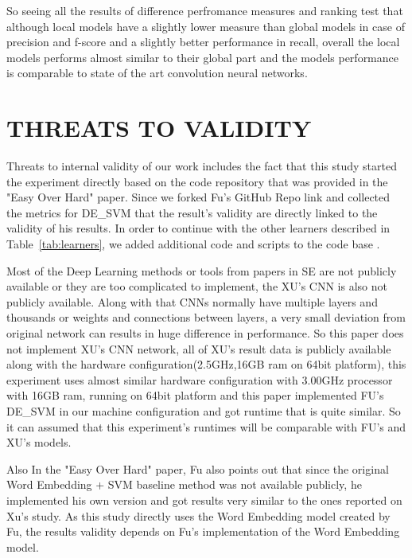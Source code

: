 \documentclass[sigconf]{acmart}
\theoremstyle{break}
\begin{document}
    So seeing all the results of difference perfromance measures and ranking test that although local models have a slightly lower measure than global models in case of precision and f-score and a slightly better performance in recall, overall the local models performs almost similar to their global part and the models performance is comparable to state of the art convolution neural networks.
    
    
\section{THREATS TO VALIDITY}
\label{sect:THREATS TO VALIDITY}
    Threats to internal validity of our work includes the fact that this study started the experiment directly based on the code repository that was provided in the "Easy Over Hard" paper. Since we forked Fu's GitHub Repo link and collected the metrics for DE\_SVM that the result's validity are directly linked to the validity of his results. In order to continue with the other learners described in Table~\ref{tab:learners}, we added additional code and scripts to the code base . 
    
    Most of the Deep Learning methods or tools from papers in SE are not publicly available or they are too complicated to implement, the XU's CNN is also not publicly available. Along with that CNNs normally have multiple layers and thousands or weights and connections between layers, a very small deviation from original network can results in huge difference in performance. So this paper does not implement XU's CNN network, all of XU's result data is publicly available along with the hardware configuration(2.5GHz,16GB ram on 64bit platform), this experiment uses almost similar hardware configuration with 3.00GHz processor with 16GB ram, running on 64bit platform and this paper implemented FU's DE\_SVM in our machine configuration and got runtime that is quite similar. So it can assumed that this experiment's runtimes will be comparable with FU's and XU's models.
    
    Also In the "Easy Over Hard" paper, Fu also points out that since the original Word Embedding + SVM baseline method was not available publicly, he implemented his own version and got results very similar to the ones reported on Xu's study. As this study directly uses the Word Embedding model created by Fu, the results validity depends on Fu's implementation of the Word Embedding model.
    
\end{document}
